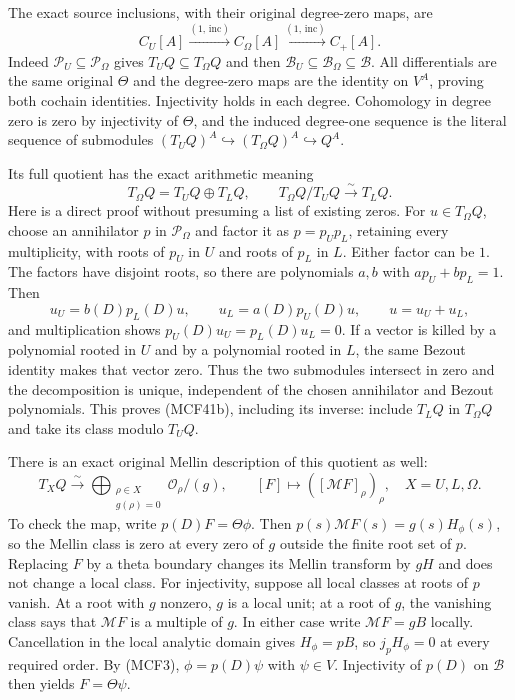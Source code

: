 The exact source inclusions, with their original degree-zero maps, are
\[
C_U[A]\xrightarrow{(1,\,\mathrm{inc})}C_\Omega[A]
       \xrightarrow{(1,\,\mathrm{inc})}C_+[A].
\tag{MCF41a}
\]
Indeed $\mathcal P_U\subseteq\mathcal P_\Omega$ gives
$T_UQ\subseteq T_\Omega Q$ and then
$\mathscr B_U\subseteq\mathscr B_\Omega\subseteq\mathscr B$.
All differentials are the same original $\Theta$ and the degree-zero
maps are the identity on $V^A$, proving both cochain identities.
Injectivity holds in each degree.  Cohomology in degree zero is zero
by injectivity of $\Theta$, and the induced degree-one sequence is
the literal sequence of submodules
$ (T_UQ)^A\hookrightarrow(T_\Omega Q)^A\hookrightarrow Q^A$.

Its full quotient has the exact arithmetic meaning
\[
T_\Omega Q=T_UQ\oplus T_LQ,\qquad
T_\Omega Q/T_UQ\xrightarrow{\sim}T_LQ.
\tag{MCF41b}
\]
Here is a direct proof without presuming a list of existing zeros.
For $u\in T_\Omega Q$, choose an annihilator $p$ in
$\mathcal P_\Omega$ and factor it as $p=p_Up_L$, retaining every
multiplicity, with roots of $p_U$ in $U$ and roots of $p_L$ in $L$.
Either factor can be $1$.  The factors have disjoint roots, so there
are polynomials $a,b$ with $ap_U+bp_L=1$.  Then
\[
u_U=b(D)p_L(D)u,\qquad u_L=a(D)p_U(D)u,
\qquad u=u_U+u_L,
\tag{MCF41c}
\]
and multiplication shows $p_U(D)u_U=p_L(D)u_L=0$.
If a vector is killed by a polynomial rooted in $U$ and by a
polynomial rooted in $L$, the same Bezout identity makes that vector
zero.  Thus the two submodules intersect in zero and the decomposition
is unique, independent of the chosen annihilator and Bezout
polynomials.  This proves (MCF41b), including its inverse: include
$T_LQ$ in $T_\Omega Q$ and take its class modulo $T_UQ$.

There is an exact original Mellin description of this quotient as well:
\[
T_XQ\xrightarrow{\sim}
\bigoplus_{\substack{\rho\in X\\g(\rho)=0}}
                     \mathcal O_\rho/(g),\qquad
[F]\longmapsto([\mathcal MF]_\rho)_\rho,
\quad X=U,L,\Omega.
\tag{MCF41d}
\]
To check the map, write $p(D)F=\Theta\phi$.  Then
$p(s)\mathcal MF(s)=g(s)H_\phi(s)$, so the Mellin class is zero
at every zero of $g$ outside the finite root set of $p$.  Replacing
$F$ by a theta boundary changes its Mellin transform by $gH$ and
does not change a local class.  For injectivity, suppose all local
classes at roots of $p$ vanish.  At a root with $g$ nonzero, $g$ is
a local unit; at a root of $g$, the vanishing class says that
$\mathcal MF$ is a multiple of $g$.  In either case write
$\mathcal MF=gB$ locally.  Cancellation in the local analytic domain
gives $H_\phi=pB$, so $j_pH_\phi=0$ at every required order.
By (MCF3), $\phi=p(D)\psi$ with $\psi\in V$.  Injectivity of $p(D)$
on $\mathscr B$ then yields $F=\Theta\psi$.

